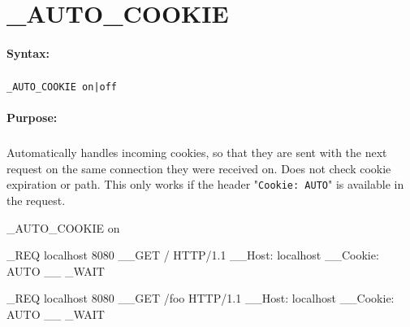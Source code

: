 
\newpage
\section{\_AUTO\_COOKIE}
\label{cmd:_AUTO_COOKIE}

\paragraph{Syntax:}
\subparagraph{}
\texttt{\_AUTO\_COOKIE on|off}

\paragraph{Purpose:}
\subparagraph{}
Automatically handles incoming cookies, so that they are sent 
with the next request on the same connection they were received on. 
Does not check cookie expiration or path.
This only works if the header "\texttt{Cookie: AUTO}" is available in the request.

\begin{usplisting}
    _AUTO_COOKIE on

    _REQ localhost 8080
    __GET / HTTP/1.1
    __Host: localhost
    __Cookie: AUTO
    __
    _WAIT

    _REQ localhost 8080
    __GET /foo HTTP/1.1
    __Host: localhost
    __Cookie: AUTO
    __
    _WAIT
\end{usplisting}
